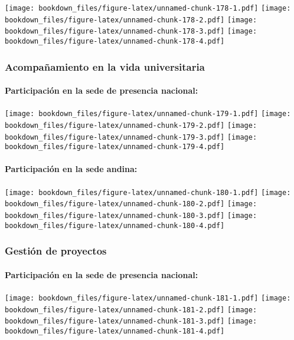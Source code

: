 \documentclass[]{article}
\let\oldparagraph\paragraph
\renewcommand{\paragraph}[1]{\oldparagraph{#1}\mbox{}}
\theoremstyle{definition}
\theoremstyle{definition}
\theoremstyle{definition}
\theoremstyle{remark}
\begin{document}
\texttt{[image: bookdown\_files/figure-latex/unnamed-chunk-178-1.pdf]}
\texttt{[image: bookdown\_files/figure-latex/unnamed-chunk-178-2.pdf]}
\texttt{[image: bookdown\_files/figure-latex/unnamed-chunk-178-3.pdf]}
\texttt{[image: bookdown\_files/figure-latex/unnamed-chunk-178-4.pdf]}

\subsubsection{Acompañamiento en la vida
universitaria}\label{acompanamiento-en-la-vida-universitaria-1}

\paragraph{Participación en la sede de presencia
nacional:}\label{participacion-en-la-sede-de-presencia-nacional-2}

\texttt{[image: bookdown\_files/figure-latex/unnamed-chunk-179-1.pdf]}
\texttt{[image: bookdown\_files/figure-latex/unnamed-chunk-179-2.pdf]}
\texttt{[image: bookdown\_files/figure-latex/unnamed-chunk-179-3.pdf]}
\texttt{[image: bookdown\_files/figure-latex/unnamed-chunk-179-4.pdf]}

\paragraph{Participación en la sede
andina:}\label{participacion-en-la-sede-andina-2}

\texttt{[image: bookdown\_files/figure-latex/unnamed-chunk-180-1.pdf]}
\texttt{[image: bookdown\_files/figure-latex/unnamed-chunk-180-2.pdf]}
\texttt{[image: bookdown\_files/figure-latex/unnamed-chunk-180-3.pdf]}
\texttt{[image: bookdown\_files/figure-latex/unnamed-chunk-180-4.pdf]}

\subsubsection{Gestión de proyectos}\label{gestion-de-proyectos-1}

\paragraph{Participación en la sede de presencia
nacional:}\label{participacion-en-la-sede-de-presencia-nacional-3}

\texttt{[image: bookdown\_files/figure-latex/unnamed-chunk-181-1.pdf]}
\texttt{[image: bookdown\_files/figure-latex/unnamed-chunk-181-2.pdf]}
\texttt{[image: bookdown\_files/figure-latex/unnamed-chunk-181-3.pdf]}
\texttt{[image: bookdown\_files/figure-latex/unnamed-chunk-181-4.pdf]}
\end{document}
